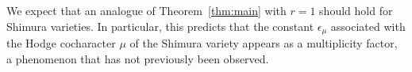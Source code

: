 \documentclass[reqno]{amsart}
\numberwithin{equation}{section}
\numberwithin{equation}{section}
\begin{document}

We expect that an analogue of Theorem~\ref{thm:main} with $r=1$ should hold for Shimura varieties. In particular, this predicts that the constant $\epsilon_{\mu}$ associated with the Hodge cocharacter $\mu$ of the Shimura variety appears as a multiplicity factor, a phenomenon that has not previously been observed.
\end{document}
